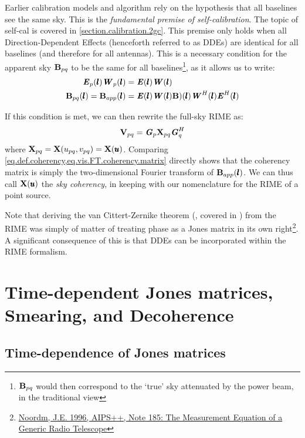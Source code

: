 \pg
Earlier calibration models and algorithm rely on the hypothesis that all baselines see the same sky. This is the \emph{fundamental premise of self-calibration}. The topic of self-cal is covered in \cref{section.calibration.2gc}. This premise only holds when all Direction-Dependent Effects (henceforth referred to as DDEs) are identical for all baselines (and therefore for all antennas). This is a necessary condition for the apparent sky $\textbf{B}_{pq}$ to be the same for all baselines\footnote{$\textbf{B}_{pq}$ would then correspond to the `true' sky attenuated by the power beam, in the traditional view}, as it allows us to write:
\begin{align}
\textbf{\emph{E}}_p(\pmb{l}) \textbf{\emph{W}}_p(\pmb{l})&= \textbf{\emph{E}}(\pmb{l}) \textbf{\emph{W}}(\pmb{l})\\
\textbf{B}_{pq}(\pmb{l}) = \textbf{B}_{app}(\pmb{l}) &= \textbf{\emph{E}}(\pmb{l}) \textbf{\emph{W}}(\pmb{l}) \textbf{B})(\pmb{l}) \textbf{\emph{W}}^H(\pmb{l}) \textbf{\emph{E}}^H(\pmb{l})
\end{align}

\pg
If this condition is met, we can then rewrite the full-sky RIME as:
\begin{equation}\label{eq.fullsky.RIME}
\textbf{V}_{pq} = \textbf{\emph{G}}_p \textbf{X}_{pq} \textbf{\emph{G}}_q^H
\end{equation}
where $\textbf{X}_{pq} = \textbf{X}(u_{pq},v_{pq}) = \textbf{X}(\pmb{u})$. Comparing \cref{eq.def.coherency,eq.vis.FT.coherency.matrix} directly shows that the coherency matrix is simply the two-dimensional Fourier transform of $\textbf{B}_{app}(\pmb{l})$. We can thus call $\textbf{X}(\pmb{u})$ the \emph{sky coherency}, in keeping with our nomenclature for the RIME of a point source.

\pg
Note that deriving the van Cittert-Zernike theorem (, covered in ) from the RIME was simply of matter of treating phase as a Jones matrix in its own right\footnote{\href{https://raw.githubusercontent.com/wiki/ska-sa/meqtrees/aips++_note185.pdf}{Noordm, J.E. 1996, AIPS++, Note 185: The Measurement Equation of a Generic Radio Telescope}}. A significant consequence of this is that DDEs can be incorporated within the RIME formalism.

\section{Time-dependent Jones matrices, Smearing, and Decoherence}
\label{section.RIME.TimeDep}

\subsection{Time-dependence of Jones matrices}
\label{section.RIME.TimeDep.Jones}

